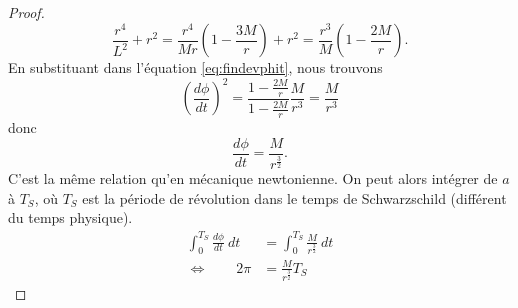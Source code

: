 \documentclass[a4paper,11pt]{report}
\theoremstyle{definition}
\theoremstyle{plain}
\theoremstyle{definition}
\theoremstyle{remark}
\begin{document}
\begin{proof}
\begin{equation}
                \frac{r^4}{L^2}+r^2 = \frac{r^4}{Mr}\left( 1-\frac{3M}{r} \right)+r^2 = \frac{r^3}{M}\left( 1-\frac{2M}{r} \right).
            \end{equation}
            En substituant dans l'équation \ref{eq:findevphit}, nous trouvons 
            \begin{equation}
                \left(\frac{d\phi}{dt}\right)^2 = \frac{1-\frac{2M}{r}}{1-\frac{2M}{r}}\frac{M}{r^3} = \frac{M}{r^3}
            \end{equation}
            donc
            \begin{equation}
                \frac{d\phi}{dt} = \frac{M}{r^{\frac{3}{2}}}.
            \end{equation}
            C'est la même relation qu'en mécanique newtonienne. On peut alors intégrer de $a$ à $T_S$, où $T_S$ est la période de révolution dans le temps de Schwarzschild (différent du temps physique).
            \begin{align}
                \int_0^{T_S}\frac{d\phi}{dt}~dt &= \int_0^{T_S}\frac{M}{r^{\frac{3}{2}}}~dt \\
                \Leftrightarrow\qquad 2\pi &= \frac{M}{r^{\frac{3}{2}}}T_S
            \end{align}
        \end{proof}
        
\end{document}
